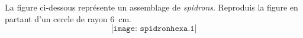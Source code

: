 La figure ci-dessous représente un assemblage de {\em
  spidrons}. Reproduis la figure en partant d'un cercle de rayon 6~cm.
\[\texttt{[image: spidronhexa.1]}\]
